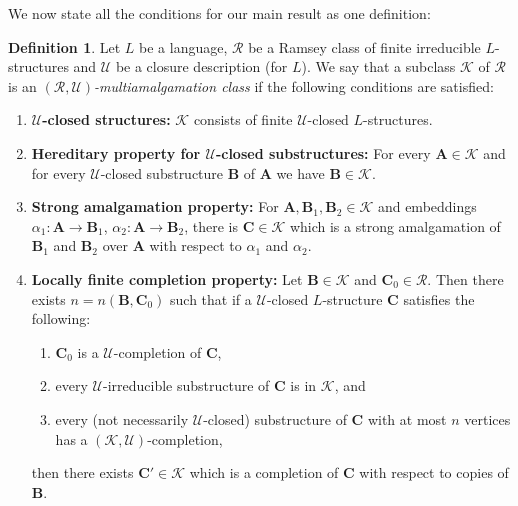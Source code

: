 \documentclass{elsarticle}
\def\str#1{\mathbf {#1}}
\def\K{{\mathcal K}}
\theoremstyle{plain}
\theoremstyle{definition}
\newtheorem{definition}[theorem]{Definition}
\theoremstyle{remark}
\begin{document}
We now state all the conditions for our main result as one definition:
\begin{definition}
\label{def:multiamalgamation}
Let $L$ be a language, $\mathcal R$ be a Ramsey class of finite irreducible $L$-structures and $\mathcal U$ be a closure description (for $L$).
We say that a subclass $\mathcal K$ of $\mathcal R$  is an \emph{$(\mathcal R,\mathcal U)$-multiamalgamation class} if
the following conditions are satisfied:
\begin{enumerate}
 \item {\bf $\mathcal U$-closed structures:} $\mathcal K$ consists of finite $\mathcal U$-closed $L$-structures.
 \item\label{cond:hereditary} {\bf Hereditary property for $\mathcal U$-closed substructures:} For every $\str{A}\in \K$ and for every $\mathcal U$-closed substructure $\str{B}$ of $\str{A}$ we have $\str{B}\in \K$.
 \item\label{cond:amalgamation} {\bf Strong amalgamation property:}
For $\str{A},\str{B}_1,\str{B}_2\in \K$ and embeddings $\alpha_1\colon\str{A}\to\str{B}_1$, $\alpha_2\colon\str{A}\to\str{B}_2$, there is $\str{C}\in \K$ which is a strong amalgamation of $\str{B}_1$ and $\str{B}_2$ over $\str{A}$ with respect to $\alpha_1$ and $\alpha_2$.
 \item\label{cond:completion} {\bf Locally finite completion property:} Let $\str{B}\in \K$ and $\str{C}_0\in \mathcal R$. 
Then there exists $n=n(\str{B},\str{C}_0)$ such that if a $\mathcal U$-closed $L$-structure $\str{C}$ satisfies the following:
\begin{enumerate}
 \item $\str{C}_0$ is a $\mathcal U$-completion of $\str{C}$, 
 \item every $\mathcal U$-irreducible substructure of $\str{C}$ is in $\mathcal K$, and
 \item every (not necessarily $\mathcal U$-closed) substructure of $\str{C}$ with at most $n$ vertices has a $(\K,\mathcal U)$-completion,
\end{enumerate}
then there exists $\str{C}'\in \K$ which is a completion of $\str{C}$ with respect to copies of $\str{B}$.
\end{enumerate}
\end{definition}
\end{document}

